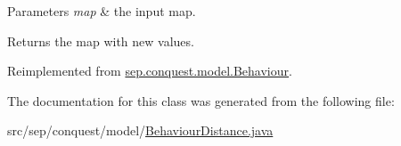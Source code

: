 \begin{DoxyParams}{Parameters}
{\em map} & the input map. \\
\hline
\end{DoxyParams}
\begin{DoxyReturn}{Returns}
the map with new values. 
\end{DoxyReturn}


Reimplemented from \hyperlink{classsep_1_1conquest_1_1model_1_1_behaviour_abaf1df42c90d2c78dd4bd17a63d89374}{sep.conquest.model.Behaviour}.



The documentation for this class was generated from the following file:\begin{DoxyCompactItemize}
\item 
src/sep/conquest/model/\hyperlink{_behaviour_distance_8java}{BehaviourDistance.java}\end{DoxyCompactItemize}
